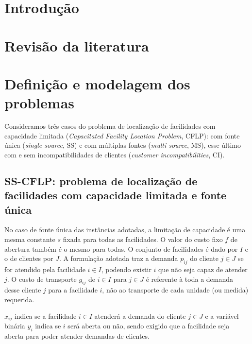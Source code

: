 \documentclass[]{article}
\title{}
\author{Guilherme Akira Demenech Mori}
\begin{document}
\maketitle

\begin{abstract}

\end{abstract}

\section{Introdução}

\section{Revisão da literatura}


\section{Definição e modelagem dos problemas}

	Consideramos três casos do problema de localização de facilidades com capacidade limitada 
	(\textit{Capacitated Facility Location Problem}, CFLP):
	com fonte única (\textit{single-source}, SS) 
	e com múltiplas fontes (\textit{multi-source}, MS), 
    esse último com e sem incompatibilidades de clientes (\textit{customer incompatibilities}, CI). 
	
\subsection{SS-CFLP: problema de localização de facilidades com capacidade limitada e fonte única}
	
	No caso de fonte única das instâncias adotadas, a limitação de capacidade é uma mesma constante $s$ fixada para todas as facilidades.
	O valor do custo fixo $f$ de abertura também é o mesmo para todas.
	O conjunto de facilidades é dado por $I$ e o de clientes por $J$.
	A formulação adotada traz a demanda $p_{ij}$ do cliente $j \in J$ se for atendido pela facilidade $i \in I$, 
	podendo existir $i$ que não seja capaz de atender $j$.
	O custo de transporte $g_{ij}$ de $i \in I$ para $j \in J$ é referente à toda a demanda desse cliente $j$ para a facilidade $i$, não ao transporte de cada unidade (ou medida) requerida.
	
	$x_{ij}$ indica se a facilidade $i \in I$ atenderá a demanda do cliente $j \in J$ 
	e a variável binária $y_i$ indica se $i $ será aberta ou não, sendo exigido que a facilidade seja aberta para poder atender demandas de clientes.
	
\end{document}
